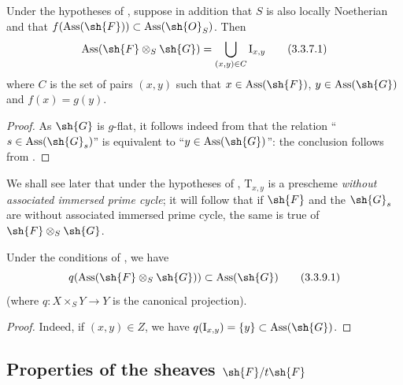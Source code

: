\begin{corollary}[3.3.7]
\label{IV.3.3.7}
Under the hypotheses of , suppose in addition that $S$ is also locally Noetherian and that $f(\operatorname{Ass}(\sh{F}))\subset\operatorname{Ass}(\sh{O}_S)$.
Then
\[
\label{IV.3.3.7.1}
\operatorname{Ass}(\sh{F}\otimes_S\sh{G})=\bigcup_{(x,y)\in C}\mathrm{I}_{x,y}
\tag{3.3.7.1}
\]
where $C$ is the set of pairs $(x,y)$ such that $x\in\operatorname{Ass}(\sh{F})$, $y\in\operatorname{Ass}(\sh{G})$ and $f(x)=g(y)$.
\end{corollary}

\begin{proof}
As $\sh{G}$ is $g$-flat, it follows indeed from  that the relation ``$s\in\operatorname{Ass}(\sh{G}_s)$'' is equivalent to ``$y\in\operatorname{Ass}(\sh{G})$'': the conclusion follows from .
\end{proof}

\begin{remark}[3.3.8]
\label{IV.3.3.8}
We shall see later  that under the hypotheses of , $\mathrm{T}_{x,y}$ is a prescheme \emph{without associated immersed prime cycle}; it will follow that if $\sh{F}$ and the $\sh{G}_s$ are without associated immersed prime cycle, the same is true of $\sh{F}\otimes_S\sh{G}$.
\end{remark}

\begin{corollary}[3.3.9]
\label{IV.3.3.9}
Under the conditions of , we have
\[
\label{IV.3.3.9.1}
q(\operatorname{Ass}(\sh{F}\otimes_S\sh{G}))\subset\operatorname{Ass}(\sh{G})
\tag{3.3.9.1}
\]
(where $q:X\times_S Y\to Y$ is the canonical projection).
\end{corollary}

\begin{proof}
Indeed, if $(x,y)\in Z$, we have $q(\mathrm{I}_{x,y})=\{y\}\subset\operatorname{Ass}(\sh{G})$.
\end{proof}


\subsection{Properties of the sheaves \texorpdfstring{$\sh{F}/t\sh{F}$}{F/tF}}
\label{subsection:IV.3.4}

